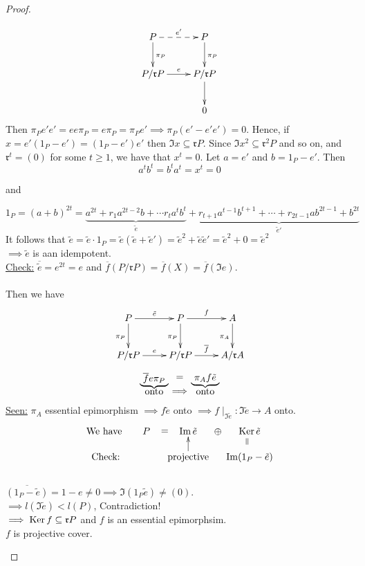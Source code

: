 \begin{thm}
\begin{proof}
\begin{enumerate}
\[
\xymatrix{
P\ar@{-->}[r]^{e'} \ar[d]^{\pi_P} & P \ar[d]^{\pi_P}\\
P/\mathfrak{r}P \ar[r]^e & P/\mathfrak{r}P \ar[d]\\
&0
}
\]
Then $\pi_P e'e' = ee\pi_P = e\pi_P = \pi_P e' \implies \pi_P(e'-e'e') = 0$. Hence, if $x = e'(1_P - e') = (1_P-e')e'$ then $\Im x \subseteq \mathfrak{r}P$. Since $\Im x^2 \subseteq \mathfrak{r}^2 P$ and so on, and $\mathfrak{r}^t = (0)$ for some $t \geq 1$, we have that $x^t = 0$. Let $a = e'$ and $b = 1_P - e'$. Then $$a^tb^t = b^ta^t = x^t = 0$$
\centerline{and}
$$1_P = (a+b)^{2t} = \underbrace{a^{2t} + r_1a^{2t-2}b + \cdots r_ta^tb^t}_{\tilde{e}} + \underbrace{r_{t+1}a^{t-1}b^{t+1} + \cdots + r_{2t-1}ab^{2t-1} + b^{2t}}_{\tilde{e}'}$$
It follows that $\tilde{e} = \tilde{e}\cdot 1_P = \tilde{e}(\tilde{e} + \tilde{e}') = \tilde{e}^2 + \tilde{e}\tilde{e}' = \tilde{e}^2 + 0 = \tilde{e}^2$\\
$\implies \tilde{e}$ is aan idempotent.\\
\underline{Check:} $\overline{\tilde{e}} = e^{2t} = e$ and $\overline{f}(P/\mathfrak{r}P) = \overline{f}(X) = \overline{f}(\Im e)$.\\
\leavevmode\\
Then we have 
\[
\xymatrix{
P \ar[r]^{\tilde{e}} \ar[d]_{\pi_P} & P \ar[r]^{f} \ar[d]_{\pi_P} & A \ar[d]_{\pi_A}\\
P/\mathfrak{r}P \ar[r]^e & P/\mathfrak{r}P \ar[r]^{\overline{f}} & A/\mathfrak{r}A
}
\]
\[\xymatrix@R-2pc{
*+[F_\}]{\overline{f}e \pi_P} \ar@{}[r]|-*[@]{=} & *+[F_\}]{\pi_A f \tilde{e}}\\
\text{onto} \ar@{}[r]|-*[@]{\implies} & \text{onto} 
}\]
\underline{Seen:} $\pi_A$ essential epimorphism $\implies f \tilde{e}$ onto $\implies f \mid_{\Im \tilde{e}}: \Im \tilde{e} \to A$ onto.\\

$$\xymatrix@R-1pc@C-1pc{
\text{We have } & P \ar@{}[r]|-*[@]{=} & \Im \tilde{e} \ar@{}[r]|-*[@]{\oplus} & \Ker \tilde{e}\\
\text{Check:} && \text{projective} \ar[u] & \Im(1_P - \tilde{e}) \ar@{}[u]|-*[@]{=}
}$$\\
$\overline{(1_P - \tilde{e})} = 1 - e \neq 0 \implies \Im (1_P \tilde{e}) \neq (0)$.\\
$\implies l(\Im \tilde{e}) < l(P)$, Contradiction!\\
$\implies \operatorname{Ker}\nolimits f \subseteq \mathfrak{r}P$ and $f$ is an essential epimorphsim.\\
$f$ is projective cover.


\end{enumerate}
\end{proof}
\end{thm}
